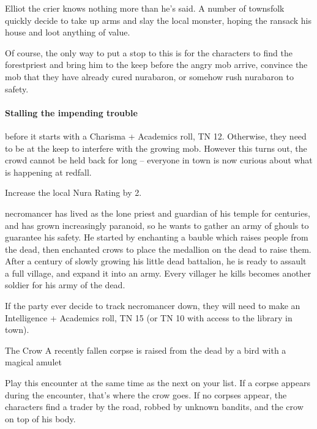 \begin{multicols}{2}
\begin{speechtext}
\end{speechtext}

Elliot the crier knows nothing more than he's said.  A number of townsfolk quickly decide to take up arms and slay the local monster, hoping the ransack his house and loot anything of value.

Of course, the only way to put a stop to this is for the characters to find the \gls{forestpriest} and bring him to the keep before the angry mob arrive, convince the mob that they have already cured \gls{nurabaron}, or somehow rush \gls{nurabaron} to safety.

\paragraph{Stalling the impending trouble}
before it starts with a Charisma + Academics roll, TN 12.
Otherwise, they need to be at the keep to interfere with the growing mob.
However this turns out, the crowd cannot be held back for long -- everyone in \gls{town} is now curious about what is happening at \gls{redfall}.

Increase the local Nura Rating by 2.

\stopcontents[sq]

\resumecontents[Forest]

\label{necromancerspet}

\stopcontents[Forest]

\startcontents[sq]

\sqminitoc

\noindent
\Gls{necromancer} has lived as the lone priest and guardian of his temple for centuries, and has grown increasingly paranoid, so he wants to gather an army of ghouls to guarantee his safety.
He started by enchanting a bauble which raises people from the dead, then enchanted crows to place the medallion on the dead to raise them.
After a century of slowly growing his little dead battalion, he is ready to assault a full village, and expand it into an army.
Every villager he kills becomes another soldier for his army of the dead.

If the party ever decide to track \gls{necromancer} down, they will need to make an Intelligence + Academics roll, TN 15 (or TN 10 with access to the library in town).

{The Crow}%
{A recently fallen corpse is raised from the dead by a bird with a magical amulet}%

Play this encounter at the same time as the next on your list.
If a corpse appears during the encounter, that's where the crow goes.
If no corpses appear, the characters find a trader by the road, robbed by unknown bandits, and the crow on top of his body.


\end{multicols}
